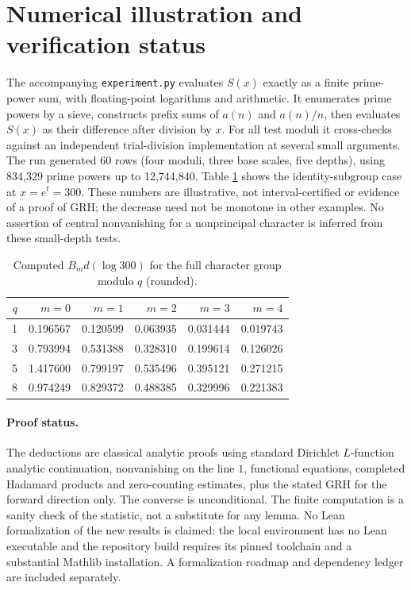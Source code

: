 \documentclass[11pt]{article}
\theoremstyle{remark}\newtheorem{remark}[theorem]{Remark}
\begin{document}
\section{Numerical illustration and verification status}
The accompanying \texttt{experiment.py} evaluates $S(x)$ exactly as a finite prime-power sum, with floating-point logarithms and arithmetic. It enumerates prime powers by a sieve, constructs prefix sums of $a(n)$ and $a(n)/n$, then evaluates $S(x)$ as their difference after division by $x$. For all test moduli it cross-checks against an independent trial-division implementation at several small arguments. The run generated 60 rows (four moduli, three base scales, five depths), using 834,329 prime powers up to 12,744,840. Table \ref{tab:results} shows the identity-subgroup case at $x=e^t=300$. These numbers are illustrative, not interval-certified or evidence of a proof of GRH; the decrease need not be monotone in other examples. No assertion of central nonvanishing for a nonprincipal character is inferred from these small-depth tests.

\begin{table}[ht]
\centering
\caption{Computed $B_m d(\log 300)$ for the full character group modulo $q$ (rounded).}\label{tab:results}
\begin{tabular}{rrrrrr}\toprule
$q$&$m=0$&$m=1$&$m=2$&$m=3$&$m=4$\\\midrule
1&0.196567&0.120599&0.063935&0.031444&0.019743\\
3&0.793994&0.531388&0.328310&0.199614&0.126026\\
5&1.417600&0.799197&0.535496&0.395121&0.271215\\
8&0.974249&0.829372&0.488385&0.329996&0.221383\\\bottomrule
\end{tabular}
\end{table}

\paragraph{Proof status.} The deductions are classical analytic proofs using standard Dirichlet $L$-function analytic continuation, nonvanishing on the line $1$, functional equations, completed Hadamard products and zero-counting estimates, plus the stated GRH for the forward direction only. The converse is unconditional. The finite computation is a sanity check of the statistic, not a substitute for any lemma. No Lean formalization of the new results is claimed: the local environment has no Lean executable and the repository build requires its pinned toolchain and a substantial Mathlib installation. A formalization roadmap and dependency ledger are included separately.
\end{document}
